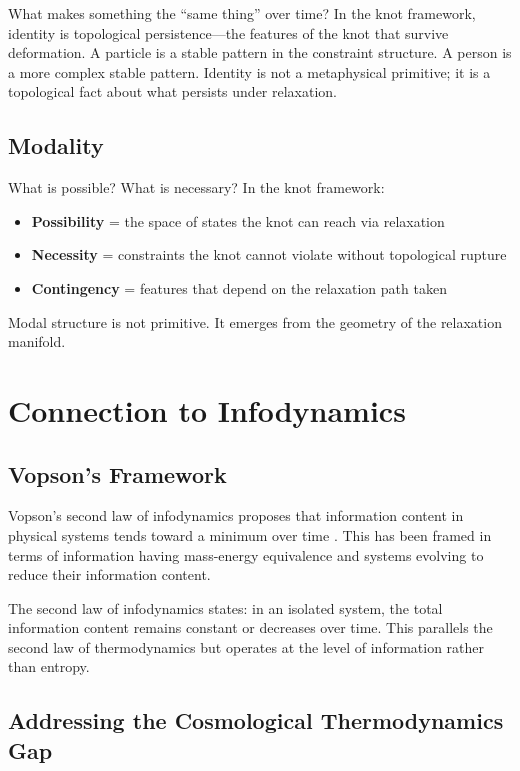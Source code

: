 \documentclass[11pt,a4paper]{article}
\begin{document}
What makes something the ``same thing'' over time? In the knot framework, identity is topological persistence---the features of the knot that survive deformation. A particle is a stable pattern in the constraint structure. A person is a more complex stable pattern. Identity is not a metaphysical primitive; it is a topological fact about what persists under relaxation.

\subsection{Modality}

What is possible? What is necessary? In the knot framework:
\begin{itemize}
    \item \textbf{Possibility} = the space of states the knot can reach via relaxation
    \item \textbf{Necessity} = constraints the knot cannot violate without topological rupture
    \item \textbf{Contingency} = features that depend on the relaxation path taken
\end{itemize}

Modal structure is not primitive. It emerges from the geometry of the relaxation manifold.

\section{Connection to Infodynamics}

\subsection{Vopson's Framework}

Vopson's second law of infodynamics proposes that information content in physical systems tends toward a minimum over time \cite{vopson2022, vopson2023}. This has been framed in terms of information having mass-energy equivalence and systems evolving to reduce their information content.

The second law of infodynamics states: in an isolated system, the total information content remains constant or decreases over time. This parallels the second law of thermodynamics but operates at the level of information rather than entropy.

\subsection{Addressing the Cosmological Thermodynamics Gap}
\end{document}
